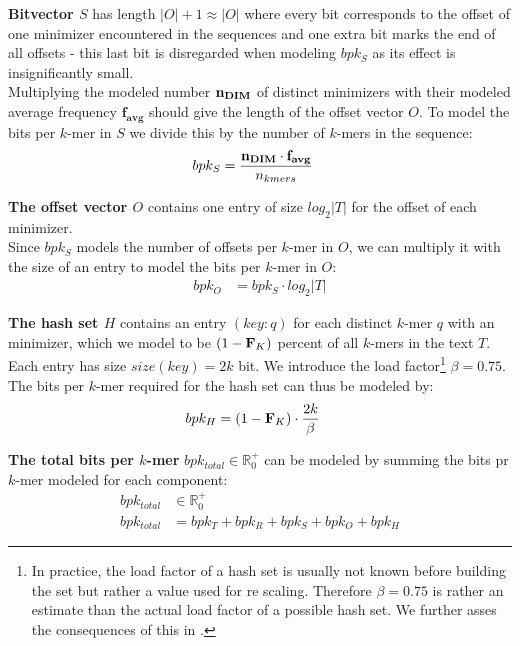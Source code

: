 \documentclass[a4paper,titlepage,onecolumn,oneside,12pt,nenglish,titlepage=firstiscover]{scrbook}
\theoremstyle{plain} %
\theoremstyle{definition} %
\theoremstyle{remark} %
\theoremstyle{plain}
\newcommand{\RR}{\mathbb{R}} %
\newcommand{\kmer}{q}
\newcommand{\varAverageFrequency}{\textbf{f}_{\textbf{avg}}}
\begin{document}
\textbf{Bitvector $S$} has length $|O|+1 \approx |O|$ where every bit corresponds to the offset of one minimizer encountered in the sequences and one extra bit marks the end of all offsets - this last bit is disregarded when modeling $bpk_S$ as its effect is insignificantly small.\\
Multiplying the modeled number $\textbf{n}_{\textbf{DIM}}$ of distinct \infrequent minimizers with their modeled average frequency $\varAverageFrequency$ should give the length of the offset vector $O$. To model the bits per $k$-mer in $S$ we divide this by the number of $k$-mers in the sequence:
\newcommand{\bpkS}{bpk_{S}	&= \frac{\varNumberOfDistinctMinimizers \cdot \varAverageFrequency}{\nkmers}}
\begin{align}
	\bpkS \label{constraint:bpkS} 
\end{align}

\textbf{The offset vector $O$} contains one entry of size $log_2 |T|$ for the offset of each \infrequent minimizer.\\
Since $bpk_S$ models the number of offsets per $k$-mer in $O$, we can multiply it with the size of an entry to model the bits per $k$-mer in $O$:
\newcommand{\bpkO}{bpk_O &= bpk_S \cdot log_2 |T|}
\begin{align}
	\bpkO \label{constraint:bpkO}
\end{align}

\textbf{The hash set $H$} contains an entry $(key:\kmer)$ for each distinct $k$-mer $\kmer$ with an \infrequent minimizer, which we model to be $(1-\textbf{F}_{K})$ percent of all $k$-mers in the text $T$.
Each entry has size $size(key) = 2k$ bit. We introduce the load factor\footnote{In practice, the load factor of a hash set is usually not known before building the set but rather a value used for re scaling. Therefore $\beta=0.75$ is rather an estimate than the actual load factor of a possible hash set. We further asses the consequences of this in .} $\beta=0.75$.
The bits per $k$-mer required for the hash set can thus be modeled by:
\newcommand{\bpkH}{bpk_H &= (1-\varCDF{K}) \cdot \frac{2k}{\beta}}
\begin{align}
	\bpkH \label{constraint:bpkH}
\end{align}

\textbf{The total bits per $k$-mer} $bpk_{total} \in \RR^+_0$ can be modeled by summing the bits pr $k$-mer modeled for each component:
\newcommand{\bpkTotal}{bpk_{total} &= bpk_T + bpk_R + bpk_S + bpk_O + bpk_H}
\begin{align}
	bpk_{total} &\in \RR^+_0 \label{variable:bpkTotal}\\
	\bpkTotal \label{constraint:bpkTotal}
\end{align}
\end{document}

